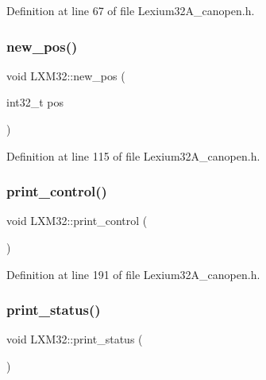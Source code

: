 Definition at line 67 of file Lexium32\+A\+\_\+canopen.\+h.

\mbox{\label{class_l_x_m32_a3b470e3d484fc0fb2a208df10a8e29e7}} 
\subsubsection{\texorpdfstring{new\+\_\+pos()}{new\_pos()}}
{\footnotesize\ttfamily void L\+X\+M32\+::new\+\_\+pos (\begin{DoxyParamCaption}\item[{int32\+\_\+t}]{pos }\end{DoxyParamCaption})\hspace{0.3cm}{\ttfamily [inline]}}



Definition at line 115 of file Lexium32\+A\+\_\+canopen.\+h.

\mbox{\label{class_l_x_m32_a545b23fab3528a8039bb2cc62808f9f5}} 
\subsubsection{\texorpdfstring{print\+\_\+control()}{print\_control()}}
{\footnotesize\ttfamily void L\+X\+M32\+::print\+\_\+control (\begin{DoxyParamCaption}{ }\end{DoxyParamCaption})\hspace{0.3cm}{\ttfamily [inline]}}



Definition at line 191 of file Lexium32\+A\+\_\+canopen.\+h.

\mbox{\label{class_l_x_m32_a201d8f9da28994a92612e2618b7a1167}} 
\subsubsection{\texorpdfstring{print\+\_\+status()}{print\_status()}}
{\footnotesize\ttfamily void L\+X\+M32\+::print\+\_\+status (\begin{DoxyParamCaption}{ }\end{DoxyParamCaption})\hspace{0.3cm}{\ttfamily [inline]}}




